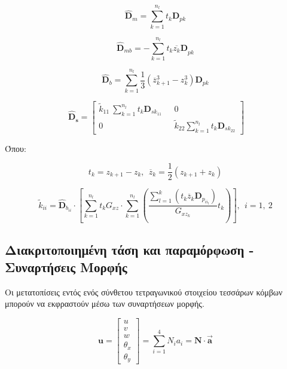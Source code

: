 \begin{equation}
{\hat{\mathbf{D}}}_{m} = \sum_{k = 1}^{n_{l}}{t_{k}\mathbf{D}_{pk}}
\end{equation}

\begin{equation}
{\hat{\mathbf{D}}}_{mb} = - \sum_{k = 1}^{n_{l}}{t_{k}{\overline{z_{k}}\mathbf{D}}_{pk}}
\end{equation}

\begin{equation}
    \hat{\mathbf{D}}_{b} = \sum_{k = 1}^{n_{l}} \frac{1}{3} \left( \overline{z}_{k + 1}^{3} - z_{k}^{3} \right) \mathbf{D}_{pk}
\end{equation}


\begin{equation}
\ {\hat{\mathbf{D}}}_{\mathbf{s}}=\begin{bmatrix}
{\widetilde{k}}_{11}\ \sum_{k = 1}^{n_{l}}{t_{k}\mathbf{D}_{sk_{11}}}\ \ \  & 0 \\
0 & {\widetilde{k}}_{22}\sum_{k = 1}^{n_{l}}{t_{k}\mathbf{D}_{sk_{22}}}
\end{bmatrix}
\end{equation}

Όπου:

\[t_{k} = z_{k + 1} - z_{k},\ \ {\overline{z}}_{k} = \frac{1}{2}\left( z_{k + 1} + z_{k} \right)\]

\[{\widetilde{k}}_{ii} = {\hat{\mathbf{D}}}_{b_{ii}} \cdot \left\lbrack \sum_{k = 1}^{n_{l}}{t_{k}G_{xz}} \cdot \sum_{k = 1}^{n_{l}}\left( \frac{\sum_{l = 1}^{k}\left( t_{k}{\overline{z}}_{k}\mathbf{D}_{p_{{ii}_{l}}} \right)}{G_{xz_{k}}}t_{k} \right) \right\rbrack,\ \ i = 1,\ 2\]

\subsection{Διακριτοποιημένη τάση και παραμόρφωση - Συναρτήσεις Μορφής}\label{discretized-stress-and-strain---shape-functions}


Οι μετατοπίσεις εντός ενός σύνθετου τετραγωνικού στοιχείου τεσσάρων κόμβων μπορούν να εκφραστούν μέσω των συναρτήσεων μορφής.

\begin{equation}
\mathbf{u} = \begin{bmatrix}
u \\
v \\
w \\
\theta_{x} \\
\theta_{y}
\end{bmatrix} = \sum_{i = 1}^{4}{N_{i}a_{i}} = \mathbf{N \cdot}\vec{\mathbf{a}}
\end{equation}

